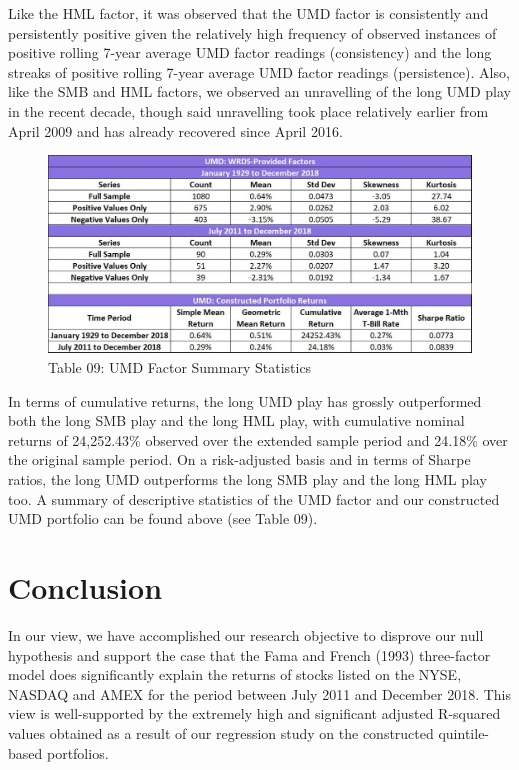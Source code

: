 \documentclass[12pt]{article}
\begin{document}
\noindent Like the HML factor, it was observed that the UMD factor is consistently and persistently positive given the relatively high frequency of observed instances of positive rolling 7-year average UMD factor readings (consistency) and the long streaks of positive rolling 7-year average UMD factor readings (persistence). Also, like the SMB and HML factors, we observed an unravelling of the long UMD play in the recent decade, though said unravelling took place relatively earlier from April 2009 and has already recovered since April 2016. 

\begin{figure}[h]
	\centering
	\includegraphics[width=0.8\linewidth]{UMD02}
	\caption*{Table 09: UMD Factor Summary Statistics}
	\label{fig:label}
\end{figure}

\noindent In terms of cumulative returns, the long UMD play has grossly outperformed both the long SMB play and the long HML play, with cumulative nominal returns of 24,252.43\% observed over the extended sample period and 24.18\% over the original sample period. On a risk-adjusted basis and in terms of Sharpe ratios, the long UMD outperforms the long SMB play and the long HML play too. A summary of descriptive statistics of the UMD factor and our constructed UMD portfolio can be found above (see Table 09).


	\section{Conclusion} %
	\noindent In our view, we have accomplished our research objective to disprove our null hypothesis and support the case that the Fama and French (1993) three-factor model does significantly explain the returns of stocks listed on the NYSE, NASDAQ and AMEX for the period between July 2011 and December 2018. This view is well-supported by the extremely high and significant adjusted R-squared values obtained as a result of our regression study on the constructed quintile-based portfolios.\\
	
\end{document}
